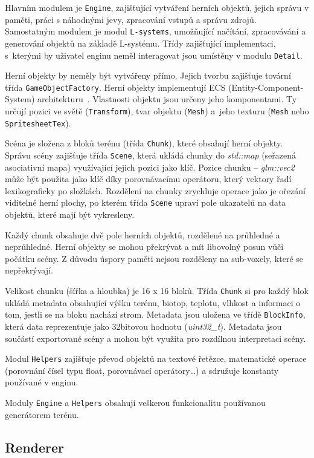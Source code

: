\documentclass[thesis=M,czech]{FITthesis}[2019/12/23]
\begin{document}
Hlavním modulem je \texttt{Engine}, zajišťující vytváření herních objektů, jejich správu v paměti, práci s náhodnými jevy, zpracování vstupů a správu zdrojů. Samostatným modulem je modul \texttt{L-systems}, umožňující načítání, zpraco\-vá\-vá\-ní a generování objektů na základě L-systému. Třídy zajišťující implementaci, s~kterými by uživatel enginu neměl interagovat jsou umístěny v modulu \texttt{Detail}.

Herní objekty by neměly být vytvářeny přímo. Jejich tvorbu zajišťuje tovární třída \texttt{GameObjectFactory}. Herní objekty implementují ECS (Entity-Component-System) architekturu~\cite{ecs}. Vlastnosti objektu jsou určeny jeho komponentami. Ty určují pozici ve světě (\texttt{Transform}), tvar objektu (\texttt{Mesh}) a~jeho texturu (\texttt{Mesh} nebo \texttt{SpritesheetTex}).

Scéna je složena z bloků terénu (třída \texttt{Chunk}), které obsahují herní objekty. Správu scény zajišťuje třída \texttt{Scene}, která ukládá chunky do \textit{std::map} (seřazená asociativní mapa) využívající jejich pozici jako klíč. Pozice chunku -- \textit{glm::vec2} může být použita jako klíč díky porovnávacímu operátoru, který vektory řadí lexikograficky po složkách. Rozdělení na chunky zrychluje operace jako je ořezání viditelné herní plochy, po kterém třída \texttt{Scene} upraví pole ukazatelů na data objektů, které mají být vykresleny.

Každý chunk obsahuje dvě pole herních objektů, rozdělené na průhledné a neprůhledné. Herní objekty se mohou překrývat a mít libovolný posun vůči počátku scény. Z důvodu úspory paměti nejsou rozděleny na sub-voxely, které se nepřekrývají.

Velikost chunku (šířka a hloubka) je 16 x 16 bloků. Třída \texttt{Chunk} si pro každý blok ukládá metadata obsahující výšku terénu, biotop, teplotu, vlhkost a informaci o tom, jestli se na bloku nachází strom. Metadata jsou uložena ve třídě \texttt{BlockInfo}, která data reprezentuje jako 32bitovou hodnotu (\textit{uint32\_t}). Metadata jsou součástí exportované scény a mohou být využita pro rozdílnou interpretaci scény.

Modul \texttt{Helpers} zajišťuje převod objektů na textové řetězce, matematické operace (porovnání čísel typu float, porovnávací operátory\dots) a sdružuje konstanty používané v enginu.

Moduly \texttt{Engine} a \texttt{Helpers} obsahují veškerou funkcionalitu používanou generátorem terénu. 

\subsection{Renderer}
\end{document}
